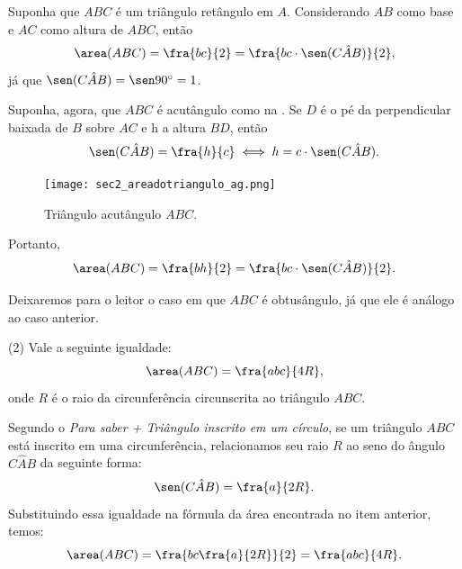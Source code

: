 \begin{description}[wide]\small
\item[Demonstração:]
\leavevmode{}\label{sec2_formulaarea1}
Suponha que $ABC$ é um triângulo retângulo em $A$. Considerando $AB$ como base e $AC$ como altura de $ABC$, então 
$$\area(ABC)=\fra{bc}{2}=\fra{bc\cdot\sen(C\hat{A}B)}{2},$$
já que $\sen(C\hat{A}B)=\sen90^\circ=1$.

Suponha, agora, que $ABC$ é acutângulo como na . Se $D$ é o pé da perpendicular baixada de $B$ sobre $AC$ e h a altura $BD$, então
$$\sen(C\hat{A}B)=\fra{h}{c}\iff h=c\cdot\sen(C\hat{A}B).$$

\begin{figure}[H]
    \centering
    \texttt{[image: sec2\_areadotriangulo\_ag.png]}
    \caption{Triângulo acutângulo $ABC$.}
    \label{sec2_areadotriangulo_ag_res}
\end{figure}

Portanto,
$$\area(ABC)=\fra{bh}{2}=\fra{bc\cdot\sen(C\hat{A}B)}{2}.$$

Deixaremos para o leitor o caso em que $ABC$ é obtusângulo, já que ele é análogo ao caso anterior.
\end{description}

(2) Vale a seguinte igualdade: 
\begin{equation}
    \area(ABC)=\fra{abc}{4R},\label{sec2_areatriag2}
\end{equation}
onde $R$ é o raio  da circunferência circunscrita ao triângulo $ABC$.

\begin{description}[wide]
\small
\item[Demonstração:]
\label{sec2_formulaarea2} 
Segundo o \textit{Para saber + Triângulo inscrito em um círculo}, se um triângulo $ABC$ está inscrito em uma circunferência, relacionamos seu raio $R$ ao seno do ângulo $C\hat{A}B$ da seguinte forma: 
$$\sen(C\hat{A}B)=\fra{a}{2R}.$$ 
Substituindo essa igualdade na fórmula da área encontrada no item anterior, temos:
$$\area(ABC)=\fra{bc\fra{a}{2R}}{2}=\fra{abc}{4R}.$$
\end{description}


\exercise

